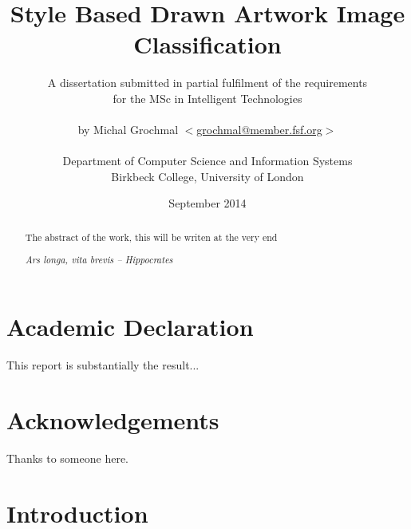 \documentclass[11pt,a4paper]{report}
\title{Style Based Drawn Artwork Image Classification}
\author{A dissertation submitted in partial fulfilment of the requirements\\
  for the MSc in Intelligent Technologies\\
  \\
  by Michal Grochmal
  $<$\href{mailto:grochmal@member.fsf.org}{grochmal@member.fsf.org}$>$\\
  \\
  Department of Computer Science and Information Systems\\
  Birkbeck College, University of London
}
\date{September 2014}
\begin{document}
\maketitle

\newpage
\null
\thispagestyle{empty}
\newpage

\pagestyle{fancy}
\lhead{}
\rhead{}

\begin{abstract}

The abstract of the work, this will be writen at the very end

\begin{flushright}
\emph{Ars longa, vita brevis -- Hippocrates}
\end{flushright}
\end{abstract}

\newpage
\null
\thispagestyle{empty}
\newpage

\newpage
{}
{}
\setcounter{page}{1}
\tableofcontents

\newpage
{}
{}
\listoffigures

\newpage
{}
{}
\listoftables

\newpage
{}
{}
\chapter*{Academic Declaration}
This report is substantially the result...

\newpage
{}
{}
\chapter*{Acknowledgements}
Thanks to someone here.

\newpage
\setcounter{page}{1}

\chapter{Introduction}
\end{document}
